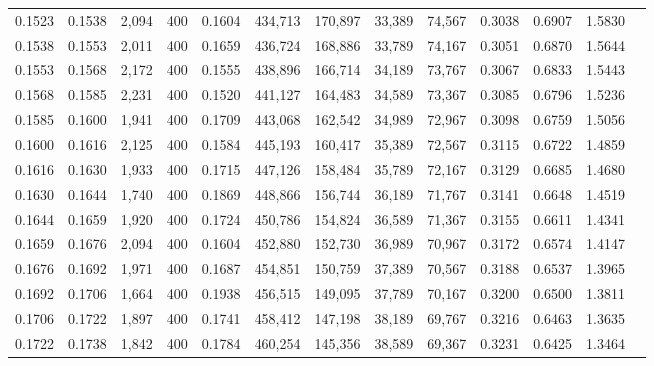 \begin{tabular}{rrrrrrrrrrrrr}
0.1523 & 0.1538 &  2,094 &   400 &                                     0.1604 & 434,713 & 170,897 &  33,389 &  74,567 & 0.3038 & 0.6907 & 1.5830 \\
0.1538 & 0.1553 &  2,011 &   400 &                                     0.1659 & 436,724 & 168,886 &  33,789 &  74,167 & 0.3051 & 0.6870 & 1.5644 \\
0.1553 & 0.1568 &  2,172 &   400 &                                     0.1555 & 438,896 & 166,714 &  34,189 &  73,767 & 0.3067 & 0.6833 & 1.5443 \\
0.1568 & 0.1585 &  2,231 &   400 &                                     0.1520 & 441,127 & 164,483 &  34,589 &  73,367 & 0.3085 & 0.6796 & 1.5236 \\
0.1585 & 0.1600 &  1,941 &   400 &                                     0.1709 & 443,068 & 162,542 &  34,989 &  72,967 & 0.3098 & 0.6759 & 1.5056 \\
0.1600 & 0.1616 &  2,125 &   400 &                                     0.1584 & 445,193 & 160,417 &  35,389 &  72,567 & 0.3115 & 0.6722 & 1.4859 \\
0.1616 & 0.1630 &  1,933 &   400 &                                     0.1715 & 447,126 & 158,484 &  35,789 &  72,167 & 0.3129 & 0.6685 & 1.4680 \\
0.1630 & 0.1644 &  1,740 &   400 &                                     0.1869 & 448,866 & 156,744 &  36,189 &  71,767 & 0.3141 & 0.6648 & 1.4519 \\
0.1644 & 0.1659 &  1,920 &   400 &                                     0.1724 & 450,786 & 154,824 &  36,589 &  71,367 & 0.3155 & 0.6611 & 1.4341 \\
0.1659 & 0.1676 &  2,094 &   400 &                                     0.1604 & 452,880 & 152,730 &  36,989 &  70,967 & 0.3172 & 0.6574 & 1.4147 \\
0.1676 & 0.1692 &  1,971 &   400 &                                     0.1687 & 454,851 & 150,759 &  37,389 &  70,567 & 0.3188 & 0.6537 & 1.3965 \\
0.1692 & 0.1706 &  1,664 &   400 &                                     0.1938 & 456,515 & 149,095 &  37,789 &  70,167 & 0.3200 & 0.6500 & 1.3811 \\
0.1706 & 0.1722 &  1,897 &   400 &                                     0.1741 & 458,412 & 147,198 &  38,189 &  69,767 & 0.3216 & 0.6463 & 1.3635 \\
0.1722 & 0.1738 &  1,842 &   400 &                                     0.1784 & 460,254 & 145,356 &  38,589 &  69,367 & 0.3231 & 0.6425 & 1.3464 \\

\end{tabular}
